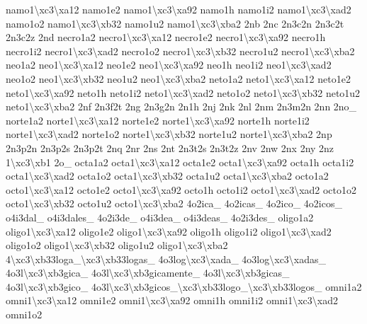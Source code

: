 {namo1\textbackslash{}xc3\textbackslash{}xa12 namo1e2 namo1\textbackslash{}xc3\textbackslash{}xa92 namo1h namo1i2 namo1\textbackslash{}xc3\textbackslash{}xad2 namo1o2 namo1\textbackslash{}xc3\textbackslash{}xb32 namo1u2 namo1\textbackslash{}xc3\textbackslash{}xba2 2nb 2nc 2n3c2n 2n3c2t 2n3c2z 2nd necro1a2 necro1\textbackslash{}xc3\textbackslash{}xa12 necro1e2 necro1\textbackslash{}xc3\textbackslash{}xa92 necro1h necro1i2 necro1\textbackslash{}xc3\textbackslash{}xad2 necro1o2 necro1\textbackslash{}xc3\textbackslash{}xb32 necro1u2 necro1\textbackslash{}xc3\textbackslash{}xba2 neo1a2 neo1\textbackslash{}xc3\textbackslash{}xa12 neo1e2 neo1\textbackslash{}xc3\textbackslash{}xa92 neo1h neo1i2 neo1\textbackslash{}xc3\textbackslash{}xad2 neo1o2 neo1\textbackslash{}xc3\textbackslash{}xb32 neo1u2 neo1\textbackslash{}xc3\textbackslash{}xba2 neto1a2 neto1\textbackslash{}xc3\textbackslash{}xa12 neto1e2 neto1\textbackslash{}xc3\textbackslash{}xa92 neto1h neto1i2 neto1\textbackslash{}xc3\textbackslash{}xad2 neto1o2 neto1\textbackslash{}xc3\textbackslash{}xb32 neto1u2 neto1\textbackslash{}xc3\textbackslash{}xba2 2nf 2n3f2t 2ng 2n3g2n 2n1h 2nj 2nk 2nl 2nm 2n3m2n 2nn 2no\-\_\- norte1a2 norte1\textbackslash{}xc3\textbackslash{}xa12 norte1e2 norte1\textbackslash{}xc3\textbackslash{}xa92 norte1h norte1i2 norte1\textbackslash{}xc3\textbackslash{}xad2 norte1o2 norte1\textbackslash{}xc3\textbackslash{}xb32 norte1u2 norte1\textbackslash{}xc3\textbackslash{}xba2 2np 2n3p2n 2n3p2s 2n3p2t 2nq 2nr 2ns 2nt 2n3t2s 2n3t2z 2nv 2nw 2nx 2ny 2nz 1\textbackslash{}xc3\textbackslash{}xb1 2o\-\_\- octa1a2 octa1\textbackslash{}xc3\textbackslash{}xa12 octa1e2 octa1\textbackslash{}xc3\textbackslash{}xa92 octa1h octa1i2 octa1\textbackslash{}xc3\textbackslash{}xad2 octa1o2 octa1\textbackslash{}xc3\textbackslash{}xb32 octa1u2 octa1\textbackslash{}xc3\textbackslash{}xba2 octo1a2 octo1\textbackslash{}xc3\textbackslash{}xa12 octo1e2 octo1\textbackslash{}xc3\textbackslash{}xa92 octo1h octo1i2 octo1\textbackslash{}xc3\textbackslash{}xad2 octo1o2 octo1\textbackslash{}xc3\textbackslash{}xb32 octo1u2 octo1\textbackslash{}xc3\textbackslash{}xba2 4o2ica\-\_\- 4o2icas\-\_\- 4o2ico\-\_\- 4o2icos\-\_\- o4i3dal\-\_\- o4i3dales\-\_\- 4o2i3de\-\_\- o4i3dea\-\_\- o4i3deas\-\_\- 4o2i3des\-\_\- oligo1a2 oligo1\textbackslash{}xc3\textbackslash{}xa12 oligo1e2 oligo1\textbackslash{}xc3\textbackslash{}xa92 oligo1h oligo1i2 oligo1\textbackslash{}xc3\textbackslash{}xad2 oligo1o2 oligo1\textbackslash{}xc3\textbackslash{}xb32 oligo1u2 oligo1\textbackslash{}xc3\textbackslash{}xba2 4\textbackslash{}xc3\textbackslash{}xb33loga\-\_\textbackslash{}xc3\textbackslash{}xb33logas\-\_\- 4o3log\textbackslash{}xc3\textbackslash{}xada\-\_\- 4o3log\textbackslash{}xc3\textbackslash{}xadas\-\_\- 4o3l\textbackslash{}xc3\textbackslash{}xb3gica\-\_\- 4o3l\textbackslash{}xc3\textbackslash{}xb3gicamente\-\_\- 4o3l\textbackslash{}xc3\textbackslash{}xb3gicas\-\_\- 4o3l\textbackslash{}xc3\textbackslash{}xb3gico\-\_\- 4o3l\textbackslash{}xc3\textbackslash{}xb3gicos\-\_\textbackslash{}xc3\textbackslash{}xb33logo\-\_\textbackslash{}xc3\textbackslash{}xb33logos\-\_\- omni1a2 omni1\textbackslash{}xc3\textbackslash{}xa12 omni1e2 omni1\textbackslash{}xc3\textbackslash{}xa92 omni1h omni1i2 omni1\textbackslash{}xc3\textbackslash{}xad2 omni1o2 }
